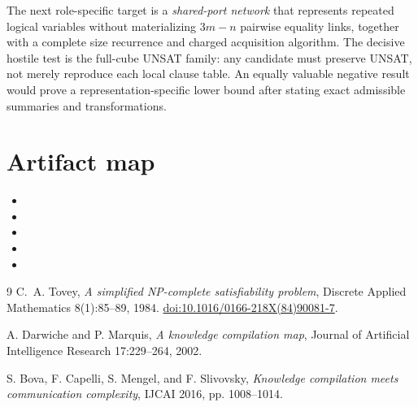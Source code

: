 \documentclass[11pt]{article}
\begin{document}
The next role-specific target is a \emph{shared-port network} that represents
repeated logical variables without materializing $3m-n$ pairwise equality
links, together with a complete size recurrence and charged acquisition
algorithm.  The decisive hostile test is the full-cube UNSAT family: any
candidate must preserve UNSAT, not merely reproduce each local clause table.
An equally valuable negative result would prove a representation-specific
lower bound after stating exact admissible summaries and transformations.

\section*{Artifact map}
\begin{itemize}
\item {}
\item {}
\item {}
\item {}
\item {}
\end{itemize}

\begin{thebibliography}{9}
C.~A. Tovey,
\emph{A simplified NP-complete satisfiability problem},
Discrete Applied Mathematics 8(1):85--89, 1984.
\href{https://doi.org/10.1016/0166-218X(84)90081-7}{doi:10.1016/0166-218X(84)90081-7}.

A. Darwiche and P. Marquis,
\emph{A knowledge compilation map},
Journal of Artificial Intelligence Research 17:229--264, 2002.

S. Bova, F. Capelli, S. Mengel, and F. Slivovsky,
\emph{Knowledge compilation meets communication complexity},
IJCAI 2016, pp. 1008--1014.
\end{thebibliography}
\end{document}

